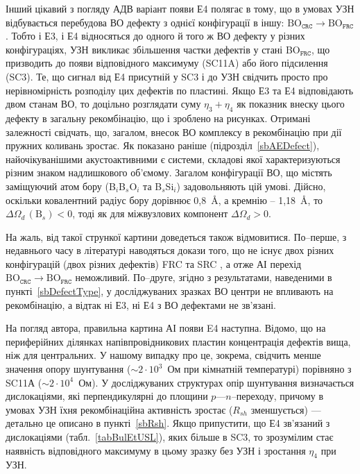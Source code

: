 Інший цікавий з погляду АДВ варіант появи Е4 полягає в тому, що в умовах УЗН відбувається
перебудова ВО дефекту з однієї конфігурації в іншу: $\mbox{BO}_\mathtt{CRC} \rightarrow \mbox{BO}_\mathtt{FRC}$.
Тобто і Е3, і Е4 відносяться до одного й того ж ВО дефекту у різних конфігураціях,
УЗН викликає збільшення частки дефектів у стані  BO$_\mathtt{FRC}$, що призводить до появи відповідного максимуму (SC11A) або його підсилення (SC3).
Те, що сигнал від Е4 присутній у SC3 і до УЗН свідчить просто про нерівномірність розподілу цих дефектів по пластині.
Якщо Е3 та Е4 відповідають двом станам ВО, то доцільно розглядати суму $\eta_3+\eta_4$ як показник внеску цього дефекту в загальну рекомбінацію, що і зроблено на рисунках.
Отримані залежності свідчать, що, загалом, внесок ВО комплексу в рекомбінацію при дії пружних коливань зростає.
Як показано раніше (підрозділ~\ref{sbAEDefect}), найочікуванішими акустоактивними  є системи, складові якої характеризуються різним знаком надлишкового об'ємому.
Загалом конфігурації ВО, що містять заміщуючий атом бору (B$_i$B$_s$O$_i$ та B$_s$Si$_i$) задовольняють цій умові.
Дійсно, оскільки ковалентний радіус бору дорівнює 0,8~{\AA}, а кремнію -- 1,18~{\AA},
то $\Delta\Omega_d\,(\mbox{B}_s)<0$,
тоді як для міжвузлових компонент $\Delta\Omega_d>0$.

На жаль, від такої стрункої картини доведеться також відмовитися.
По--перше, з недавнього часу в літературі наводяться докази того, що не існує двох
різних конфігурацій  (двох різних дефектів) FRC та SRC \cite{BOSingle:Voronkov,BO3i,BOSingle:SEMSS2017,Kim},
а отже АІ перехід $\mbox{BO}_\mathtt{CRC} \rightarrow \mbox{BO}_\mathtt{FRC}$ неможливий.
По--друге, згідно з результатами, наведеними в пункті~\ref{sbDefectType},
у досліджуваних зразках ВО центри не впливають на рекомбінацію,
а відтак ні Е3, ні Е4 з ВО дефектами не зв'язані.


На погляд автора, правильна картина АІ появи E4 наступна.
Відомо, що на периферійних ділянках напівпровідникових пластин концентрація дефектів вища,
ніж для центральних.
У нашому випадку про це, зокрема, свідчить менше значення  опору шунтування ($\sim2\cdot10^{3}$~Ом при кімнатній температурі) порівняно з SC11А ($\sim2\cdot10^{4}$~Ом).
У досліджуваних структурах  опір шунтування визначається дислокаціями, які перпендикулярні до площини $p$---$n$--переходу, причому в умовах УЗН їхня рекомбінаційна активність зростає ($R_{sh}$ зменшується) --- детально це описано в пункті~\ref{sbRsh}.
Якщо припустити, що Е4 зв'язаний з дислокаціями (табл.~\ref{tabBulEtUSL}), яких більше в SC3, то зрозумілим стає наявність відповідного максимуму в цьому зразку без УЗН і зростання $\eta_4$ при УЗН.

